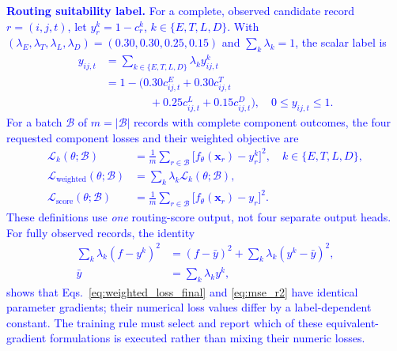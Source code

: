 \documentclass[pdflatex,sn-mathphys-num]{sn-jnl}
\newcommand{\Revised}[1]{\textcolor{blue}{#1}}
\begin{document}
\Revised{\textbf{Routing suitability label.} For a complete, observed candidate record $r=(i,j,t)$, let $y_r^k=1-c_r^k$, $k\in\{E,T,L,D\}$. With $(\lambda_E,\lambda_T,\lambda_L,\lambda_D)=(0.30,0.30,0.25,0.15)$ and $\sum_k\lambda_k=1$, the scalar label is
\begin{equation}
 \begin{aligned}
 y_{ij,t}&=\sum_{k\in\{E,T,L,D\}}\lambda_k y^k_{ij,t}\\
 &=1-\big(0.30c^E_{ij,t}+0.30c^T_{ij,t}\\
 &\hspace{4em}{}+0.25c^L_{ij,t}+0.15c^D_{ij,t}\big),
 \quad 0\le y_{ij,t}\le 1.
 \end{aligned}
 \label{eq:routing_target}
\end{equation}
For a batch $\mathcal B$ of $m=|\mathcal B|$ records with complete component outcomes, the four requested component losses and their weighted objective are
\begin{align}
 \mathcal L_k(\theta;\mathcal B)&=\frac1m\sum_{r\in\mathcal B}\big[f_\theta(\mathbf x_r)-y_r^k\big]^2,\quad k\in\{E,T,L,D\},\label{eq:component_losses_final}\\
 \mathcal L_{\mathrm{weighted}}(\theta;\mathcal B)&=\sum_k\lambda_k\mathcal L_k(\theta;\mathcal B),\label{eq:weighted_loss_final}\\
 \mathcal L_{\mathrm{score}}(\theta;\mathcal B)&=\frac1m\sum_{r\in\mathcal B}\big[f_\theta(\mathbf x_r)-y_r\big]^2.\label{eq:mse_r2}
\end{align}
These definitions use \emph{one} routing-score output, not four separate output heads. For fully observed records, the identity
\begin{align*}
 \sum_k\lambda_k(f-y^k)^2
 &= (f-\bar y)^2+\sum_k\lambda_k(y^k-\bar y)^2,\\
 \bar y&=\sum_k\lambda_k y^k,
\end{align*}
shows that Eqs.~\eqref{eq:weighted_loss_final} and \eqref{eq:mse_r2} have identical parameter gradients; their numerical loss values differ by a label-dependent constant. The training rule must select and report which of these equivalent-gradient formulations is executed rather than mixing their numeric losses.}
\end{document}
